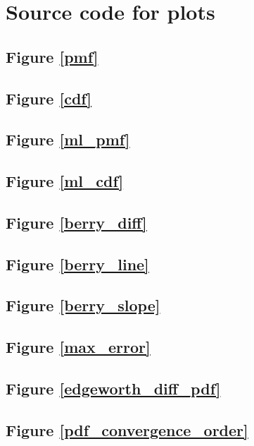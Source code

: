 \chapter{Source code for plots}

\newcommand*{\src}[1]{\section{Figure \ref{#1}}

}

\src{pmf}
\src{cdf}
\src{ml_pmf}
\src{ml_cdf}
\src{berry_diff}
\src{berry_line}
\src{berry_slope}
\src{max_error}
\src{edgeworth_diff_pdf}
\src{pdf_convergence_order}
